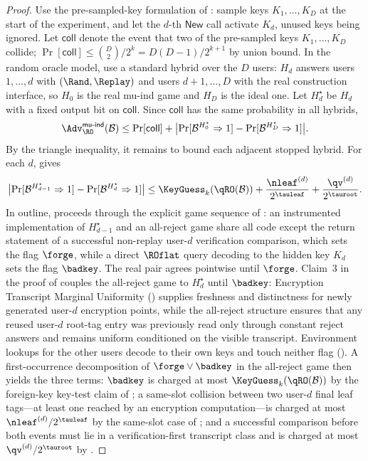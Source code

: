\begin{proof}
Use the pre-sampled-key formulation of : sample
keys $K_1,\dots,K_D$ at the start of the experiment, and let the $d$-th
$\mathsf{New}$ call activate $K_d$, unused keys being ignored.
Let $\mathsf{coll}$ denote the event that two of the pre-sampled keys
$K_1,\dots,K_D$ collide;
$\Pr[\mathsf{coll}] \leq \binom{D}{2}/2^k = D(D-1)/2^{k+1}$ by union
bound. In the random oracle model, use a standard hybrid over the $D$
users: $H_d$ answers users $1,\dots,d$ with $(\Rand,\Replay)$ and
users $d+1,\dots,D$ with the real construction interface, so $H_0$ is
the real mu-ind game and $H_D$ is the ideal one. Let $H_d^\star$ be
$H_d$ with a fixed output bit on $\mathsf{coll}$. Since
$\mathsf{coll}$ has the same probability in all hybrids,
\[
  \Adv^{\mathsf{mu\text{-}ind}}_{\RO}(\mathcal{B})
  \leq
  \Pr[\mathsf{coll}]
  +
  \bigl|\Pr[\mathcal{B}^{H_0^\star} \Rightarrow 1]
       - \Pr[\mathcal{B}^{H_D^\star} \Rightarrow 1]\bigr|.
\]
By the triangle inequality, it remains to bound each adjacent stopped
hybrid. For each $d$,  gives
\[
  \bigl|\Pr[\mathcal{B}^{H_{d-1}^\star} \Rightarrow 1]
       - \Pr[\mathcal{B}^{H_d^\star} \Rightarrow 1]\bigr|
  \leq
  \KeyGuess_k(\qRO(\mathcal{B}))
  + \frac{\nleaf^{(d)}}{2^{\tauleaf}}
  + \frac{\qv^{(d)}}{2^{\tauroot}}.
\]
In outline,  proceeds through the explicit
game sequence of : an instrumented
implementation of $H_{d-1}^\star$ and an all-reject game share all code
except the return statement of a successful non-replay user-$d$
verification comparison, which sets the flag $\forge$, while a direct
$\ROflat$ query decoding to the hidden key $K_d$ sets the flag
$\badkey$. The real pair agrees pointwise until $\forge$. Claim~3 in
the proof of  couples the all-reject game
to $H_d^\star$ until $\badkey$: Encryption Transcript Marginal
Uniformity () supplies
freshness and distinctness for newly generated user-$d$ encryption
points, while the all-reject structure ensures that any reused
user-$d$ root-tag entry was previously read only through constant
reject answers and remains uniform conditioned on the visible
transcript. Environment lookups for the other users decode to their own
keys and touch neither flag (). A
first-occurrence
decomposition of $\forge \vee \badkey$ in the all-reject game then
yields the three terms: $\badkey$ is charged at most
$\KeyGuess_k(\qRO(\mathcal{B}))$ by the foreign-key key-test claim of
; a same-slot collision between two
user-$d$ final leaf tags---at least one reached by an encryption
computation---is charged at most $\nleaf^{(d)}/2^{\tauleaf}$ by the
same-slot case of ; and a successful
comparison before both events must lie in a verification-first
transcript class and is charged at most $\qv^{(d)}/2^{\tauroot}$ by
.


\end{proof}
